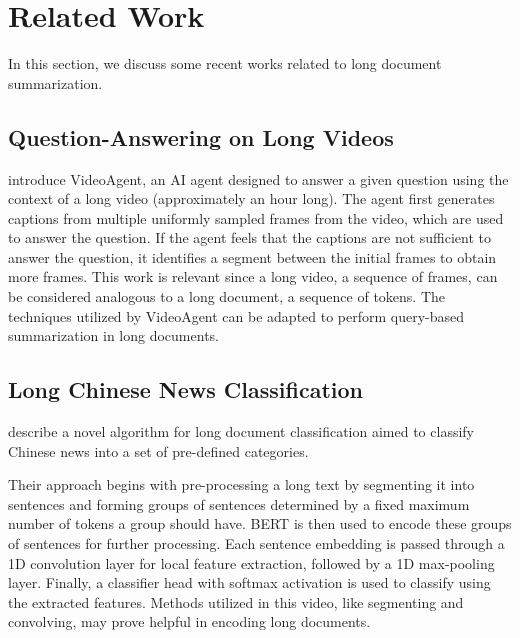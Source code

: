 \section{Related Work}

In this section, we discuss some recent works related to long document summarization.


\subsection*{Question-Answering on Long Videos}

\citet{wang2024videoagent} introduce VideoAgent, an AI agent designed to answer a
given question using the context of a long video (approximately an hour long).
The agent first generates captions from multiple uniformly sampled frames from the
video, which are used to answer the question.
If the agent feels that the captions are not sufficient to answer the question, it
identifies a segment between the initial frames to obtain more frames.
This work is relevant since a long video, a sequence of frames, can be considered
analogous to a long document, a sequence of tokens. The techniques utilized by
VideoAgent can be adapted to perform query-based summarization in long documents.


\subsection*{Long Chinese News Classification}

\citet{chen2022long} describe a novel algorithm for long document classification
aimed to classify Chinese news into a set of pre-defined categories.

Their approach begins with pre-processing a long text by segmenting it into sentences
and forming groups of sentences determined by a fixed maximum number of tokens a
group should have.
BERT is then used to encode these groups of sentences for further processing.
Each sentence embedding is passed through a 1D convolution layer for local feature
extraction, followed by a 1D max-pooling layer.
Finally, a classifier head with softmax activation is used to classify using the
extracted features.
Methods utilized in this video, like segmenting and convolving, may prove helpful in
encoding long documents.

